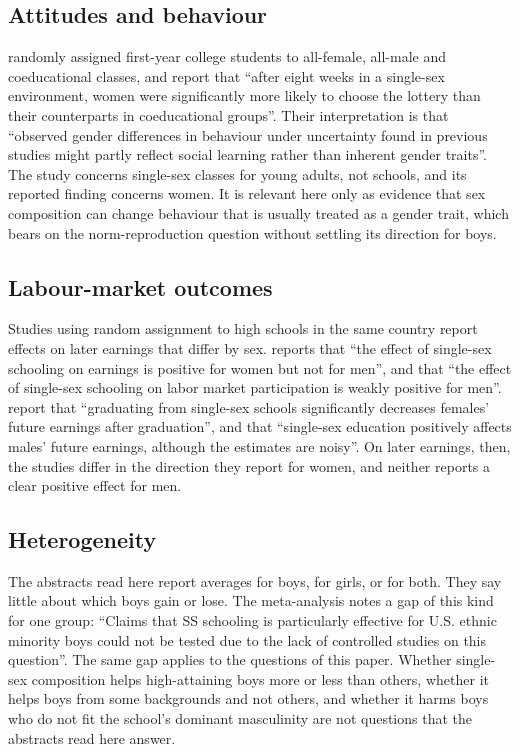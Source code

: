 \documentclass[11pt]{article}
\newcommand{\srcq}[2]{``#2''}
\begin{document}
\subsection{Attitudes and behaviour}

\citet{booth2011} randomly assigned first-year college students to all-female, all-male and coeducational classes, and report that \srcq{booth2011}{after eight weeks in a single-sex environment, women were significantly more likely to choose the lottery than their counterparts in coeducational groups}. Their interpretation is that \srcq{booth2011}{observed gender differences in behaviour under uncertainty found in previous studies might partly reflect social learning rather than inherent gender traits}. The study concerns single-sex classes for young adults, not schools, and its reported finding concerns women. It is relevant here only as evidence that sex composition can change behaviour that is usually treated as a gender trait, which bears on the norm-reproduction question without settling its direction for boys.

\subsection{Labour-market outcomes}

Studies using random assignment to high schools in the same country report effects on later earnings that differ by sex. \citet{lee2021} reports that \srcq{lee2021}{the effect of single-sex schooling on earnings is positive for women but not for men}, and that \srcq{lee2021}{the effect of single-sex schooling on labor market participation is weakly positive for men}. \citet{leenakazawa2021} report that \srcq{leenakazawa2021}{graduating from single-sex schools significantly decreases females' future earnings after graduation}, and that \srcq{leenakazawa2021}{single-sex education positively affects males' future earnings, although the estimates are noisy}. On later earnings, then, the studies differ in the direction they report for women, and neither reports a clear positive effect for men.

\subsection{Heterogeneity}

The abstracts read here report averages for boys, for girls, or for both. They say little about which boys gain or lose. The meta-analysis notes a gap of this kind for one group: \srcq{pahlke2014}{Claims that SS schooling is particularly effective for U.S. ethnic minority boys could not be tested due to the lack of controlled studies on this question}. The same gap applies to the questions of this paper. Whether single-sex composition helps high-attaining boys more or less than others, whether it helps boys from some backgrounds and not others, and whether it harms boys who do not fit the school's dominant masculinity are not questions that the abstracts read here answer.
\end{document}
